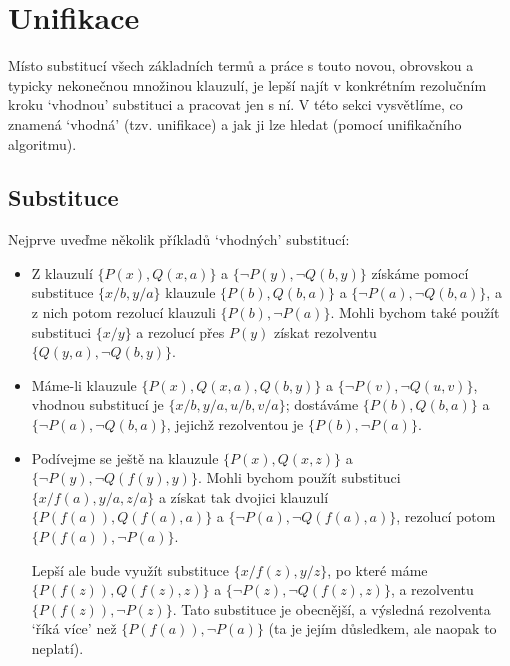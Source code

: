 \section{Unifikace}\label{section:unification}

Místo substitucí \alert{všech} základních termů a práce s touto novou, obrovskou a typicky nekonečnou množinou klauzulí, je lepší najít v konkrétním rezolučním kroku `vhodnou' substituci a pracovat jen s ní. V této sekci vysvětlíme, co znamená `vhodná' (tzv. \alert{unifikace}) a jak ji lze hledat (pomocí \alert{unifikačního 
algoritmu}).

\subsection{Substituce}

Nejprve uveďme několik příkladů `vhodných' substitucí:

\begin{example}\label{example:substitutions}
\begin{itemize}
    \item Z klauzulí $\{P(x),Q(x,a)\}$ a $\{\neg P(y),\neg Q(b,y)\}$ získáme pomocí substituce $\{x/b,y/a\}$ klauzule $\{P(b),Q(b,a)\}$ a $\{\neg P(a),\neg Q(b,a)\}$, a z nich potom rezolucí klauzuli $\{P(b),\neg P(a)\}$. Mohli bychom také použít substituci $\{x/y\}$ a rezolucí přes $P(y)$ získat rezolventu $\{Q(y,a),\neg Q(b,y)\}$.
    \item Máme-li klauzule $\{P(x),Q(x,a),Q(b,y)\}$ a $\{\neg P(v),\neg Q(u,v)\}$, vhodnou substitucí je $\{x/b,y/a,u/b,v/a\}$; dostáváme $\{P(b),Q(b,a)\}$ a $\{\neg P(a),\neg Q(b,a)\}$, jejichž rezolventou je $\{P(b),\neg P(a)\}$.
    \item Podívejme se ještě na klauzule $\{P(x),Q(x,z)\}$ a $\{\neg P(y),\neg Q(f(y),y)\}$. Mohli bychom použít substituci $\{x/f(a),y/a,z/a\}$ a získat tak dvojici klauzulí $\{P(f(a)),Q(f(a),a)\}$ a $\{\neg P(a),\neg Q(f(a),a)\}$, rezolucí potom $\{P(f(a)),\neg P(a)\}$.
    
    Lepší ale bude využít substituce $\{x/f(z),y/z\}$, po které máme $\{P(f(z)),Q(f(z),z)\}$ a $\{\neg P(z),\neg Q(f(z),z)\}$, a rezolventu $\{P(f(z)),\neg P(z)\}$. Tato substituce je \alert{obecnější}, a výsledná rezolventa `říká více' než $\{P(f(a)),\neg P(a)\}$ (ta je jejím důsledkem, ale naopak to neplatí).
\end{itemize}
\end{example}

